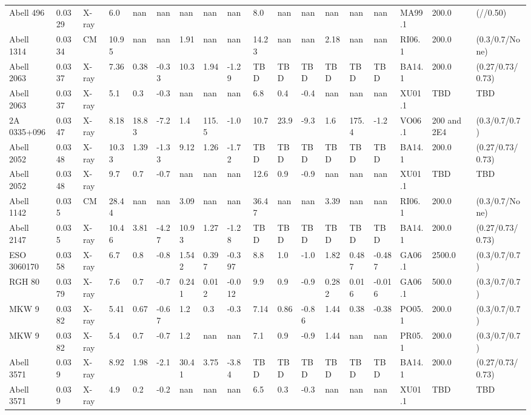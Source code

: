 \documentclass{article}
\begin{document}
\begin{center}
\begin{landscape}
\begin{longtable}{llllllllllllllllll}
Abell 496 & 0.0329 & X-ray & 6.0 & nan & nan & nan & nan & nan & 8.0 & nan & nan & nan & nan & nan & MA99.1 & 200.0 & (//0.50) \\
Abell 1314 & 0.0334 & CM & 10.95 & nan & nan & 1.91 & nan & nan & 14.23 & nan & nan & 2.18 & nan & nan & RI06.1 & 200.0 & (0.3/0.7/None) \\
Abell 2063 & 0.0337 & X-ray & 7.36 & 0.38 & -0.33 & 10.3 & 1.94 & -1.29 & TBD & TBD & TBD & TBD & TBD & TBD & BA14.1 & 200.0 & (0.27/0.73/0.73) \\
Abell 2063 & 0.0337 & X-ray & 5.1 & 0.3 & -0.3 & nan & nan & nan & 6.8 & 0.4 & -0.4 & nan & nan & nan & XU01.1 & TBD & TBD \\
2A 0335+096 & 0.0347 & X-ray & 8.18 & 18.83 & -7.2 & 1.4 & 115.5 & -1.0 & 10.7 & 23.9 & -9.3 & 1.6 & 175.4 & -1.2 & VO06.1 & 200 and 2E4 & (0.3/0.7/0.7) \\
Abell 2052 & 0.0348 & X-ray & 10.33 & 1.39 & -1.33 & 9.12 & 1.26 & -1.72 & TBD & TBD & TBD & TBD & TBD & TBD & BA14.1 & 200.0 & (0.27/0.73/0.73) \\
Abell 2052 & 0.0348 & X-ray & 9.7 & 0.7 & -0.7 & nan & nan & nan & 12.6 & 0.9 & -0.9 & nan & nan & nan & XU01.1 & TBD & TBD \\
Abell 1142 & 0.035 & CM & 28.44 & nan & nan & 3.09 & nan & nan & 36.47 & nan & nan & 3.39 & nan & nan & RI06.1 & 200.0 & (0.3/0.7/None) \\
Abell 2147 & 0.035 & X-ray & 10.46 & 3.81 & -4.27 & 10.93 & 1.27 & -1.28 & TBD & TBD & TBD & TBD & TBD & TBD & BA14.1 & 200.0 & (0.27/0.73/0.73) \\
ESO 3060170 & 0.0358 & X-ray & 6.7 & 0.8 & -0.8 & 1.542 & 0.397 & -0.397 & 8.8 & 1.0 & -1.0 & 1.82 & 0.487 & -0.487 & GA06.1 & 2500.0 & (0.3/0.7/0.7) \\
RGH 80 & 0.0379 & X-ray & 7.6 & 0.7 & -0.7 & 0.241 & 0.012 & -0.012 & 9.9 & 0.9 & -0.9 & 0.282 & 0.016 & -0.016 & GA06.1 & 500.0 & (0.3/0.7/0.7) \\
MKW 9 & 0.0382 & X-ray & 5.41 & 0.67 & -0.67 & 1.2 & 0.3 & -0.3 & 7.14 & 0.86 & -0.86 & 1.44 & 0.38 & -0.38 & PO05.1 & 200.0 & (0.3/0.7/0.7) \\
MKW 9 & 0.0382 & X-ray & 5.4 & 0.7 & -0.7 & 1.2 & nan & nan & 7.1 & 0.9 & -0.9 & 1.44 & nan & nan & PR05.1 & 200.0 & (0.3/0.7/0.7) \\
Abell 3571 & 0.039 & X-ray & 8.92 & 1.98 & -2.1 & 30.41 & 3.75 & -3.84 & TBD & TBD & TBD & TBD & TBD & TBD & BA14.1 & 200.0 & (0.27/0.73/0.73) \\
Abell 3571 & 0.039 & X-ray & 4.9 & 0.2 & -0.2 & nan & nan & nan & 6.5 & 0.3 & -0.3 & nan & nan & nan & XU01.1 & TBD & TBD \\

\end{longtable}
\end{landscape}
\end{center}
\end{document}
